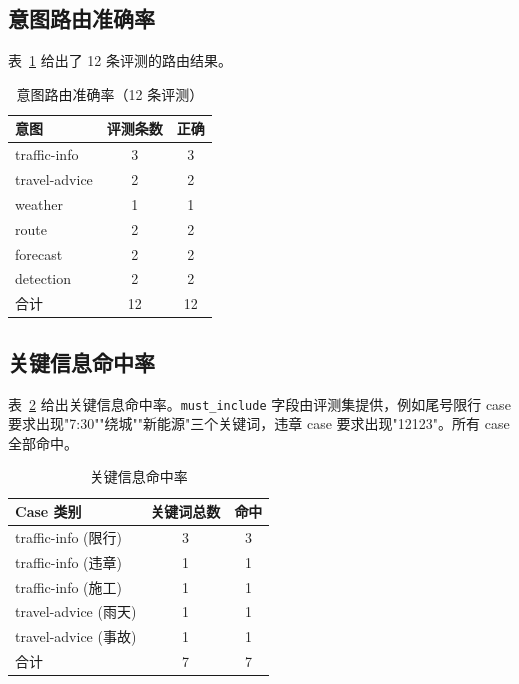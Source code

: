 \documentclass[bwprint]{report}
\begin{document}
\subsection{意图路由准确率}
表~\ref{tab:intent-acc} 给出了 12 条评测的路由结果。

\begin{table}[!htbp]
    \caption{意图路由准确率（12 条评测）}
    \label{tab:intent-acc}
    \centering
    \begin{tabular}{lcc}
        \toprule[1.5pt]
        意图 & 评测条数 & 正确 \\
        \midrule[1pt]
        traffic-info  & 3 & 3 \\
        travel-advice & 2 & 2 \\
        weather       & 1 & 1 \\
        route         & 2 & 2 \\
        forecast      & 2 & 2 \\
        detection     & 2 & 2 \\
        \midrule[1pt]
        合计          & 12 & 12 \\
        \bottomrule[1.5pt]
    \end{tabular}
\end{table}

\subsection{关键信息命中率}
表~\ref{tab:must-include} 给出关键信息命中率。\texttt{must\_include} 字段由评测集提供，例如尾号限行 case 要求出现"7:30""绕城""新能源"三个关键词，违章 case 要求出现"12123"。所有 case 全部命中。

\begin{table}[!htbp]
    \caption{关键信息命中率}
    \label{tab:must-include}
    \centering
    \begin{tabular}{lcc}
        \toprule[1.5pt]
        Case 类别 & 关键词总数 & 命中 \\
        \midrule[1pt]
        traffic-info (限行)  & 3 & 3 \\
        traffic-info (违章)  & 1 & 1 \\
        traffic-info (施工)  & 1 & 1 \\
        travel-advice (雨天) & 1 & 1 \\
        travel-advice (事故) & 1 & 1 \\
        \midrule[1pt]
        合计 & 7 & 7 \\
        \bottomrule[1.5pt]
    \end{tabular}
\end{table}
\end{document}
